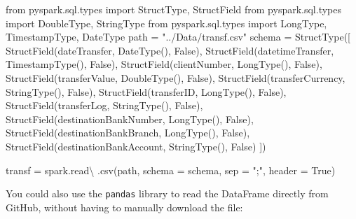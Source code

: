 \documentclass[
  11pt,
  letterpaper,
  DIV=11,
  numbers=noendperiod]{scrreprt}
\newenvironment{Shaded}{\begin{snugshade}}{\end{snugshade}}
\newcommand{\ImportTok}[1]{\textcolor[rgb]{0.00,0.46,0.62}{#1}}
\newcommand{\NormalTok}[1]{\textcolor[rgb]{0.00,0.23,0.31}{#1}}
\newcommand{\OperatorTok}[1]{\textcolor[rgb]{0.37,0.37,0.37}{#1}}
\newcommand{\StringTok}[1]{\textcolor[rgb]{0.13,0.47,0.30}{#1}}
\newcommand{\VariableTok}[1]{\textcolor[rgb]{0.07,0.07,0.07}{#1}}
\begin{document}
\begin{Shaded}
\begin{Highlighting}[]
\ImportTok{from}\NormalTok{ pyspark.sql.types }\ImportTok{import}\NormalTok{ StructType, StructField}
\ImportTok{from}\NormalTok{ pyspark.sql.types }\ImportTok{import}\NormalTok{ DoubleType, StringType}
\ImportTok{from}\NormalTok{ pyspark.sql.types }\ImportTok{import}\NormalTok{ LongType, TimestampType, DateType}
\NormalTok{path }\OperatorTok{=} \StringTok{"../Data/transf.csv"}
\NormalTok{schema }\OperatorTok{=}\NormalTok{ StructType([}
\NormalTok{  StructField(}\StringTok{\textquotesingle{}dateTransfer\textquotesingle{}}\NormalTok{, DateType(), }\VariableTok{False}\NormalTok{),}
\NormalTok{  StructField(}\StringTok{\textquotesingle{}datetimeTransfer\textquotesingle{}}\NormalTok{, TimestampType(), }\VariableTok{False}\NormalTok{),}
\NormalTok{  StructField(}\StringTok{\textquotesingle{}clientNumber\textquotesingle{}}\NormalTok{, LongType(), }\VariableTok{False}\NormalTok{),}
\NormalTok{  StructField(}\StringTok{\textquotesingle{}transferValue\textquotesingle{}}\NormalTok{, DoubleType(), }\VariableTok{False}\NormalTok{),}
\NormalTok{  StructField(}\StringTok{\textquotesingle{}transferCurrency\textquotesingle{}}\NormalTok{, StringType(), }\VariableTok{False}\NormalTok{),}
\NormalTok{  StructField(}\StringTok{\textquotesingle{}transferID\textquotesingle{}}\NormalTok{, LongType(), }\VariableTok{False}\NormalTok{),}
\NormalTok{  StructField(}\StringTok{\textquotesingle{}transferLog\textquotesingle{}}\NormalTok{, StringType(), }\VariableTok{False}\NormalTok{),}
\NormalTok{  StructField(}\StringTok{\textquotesingle{}destinationBankNumber\textquotesingle{}}\NormalTok{, LongType(), }\VariableTok{False}\NormalTok{),}
\NormalTok{  StructField(}\StringTok{\textquotesingle{}destinationBankBranch\textquotesingle{}}\NormalTok{, LongType(), }\VariableTok{False}\NormalTok{),}
\NormalTok{  StructField(}\StringTok{\textquotesingle{}destinationBankAccount\textquotesingle{}}\NormalTok{, StringType(), }\VariableTok{False}\NormalTok{)}
\NormalTok{])}

\NormalTok{transf }\OperatorTok{=}\NormalTok{ spark.read}\OperatorTok{\textbackslash{}}
\NormalTok{  .csv(path, schema }\OperatorTok{=}\NormalTok{ schema, sep }\OperatorTok{=} \StringTok{";"}\NormalTok{, header }\OperatorTok{=} \VariableTok{True}\NormalTok{)}
\end{Highlighting}
\end{Shaded}

You could also use the \texttt{pandas} library to read the DataFrame
directly from GitHub, without having to manually download the file:
\end{document}
